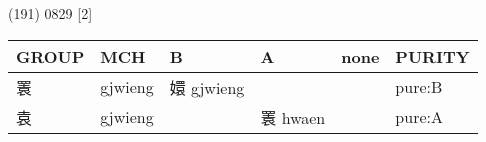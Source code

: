 \documentclass[14pt,a4paper]{scrartcl}
\begin{document}
(191) 0829 {[}2{]}

\begin{longtable}[c]{@{}llllll@{}}
\toprule
\begin{minipage}[b]{0.14\columnwidth}\raggedright\strut
GROUP
\strut\end{minipage} &
\begin{minipage}[b]{0.14\columnwidth}\raggedright\strut
MCH
\strut\end{minipage} &
\begin{minipage}[b]{0.14\columnwidth}\raggedright\strut
B
\strut\end{minipage} &
\begin{minipage}[b]{0.14\columnwidth}\raggedright\strut
A
\strut\end{minipage} &
\begin{minipage}[b]{0.14\columnwidth}\raggedright\strut
none
\strut\end{minipage} &
\begin{minipage}[b]{0.14\columnwidth}\raggedright\strut
PURITY
\strut\end{minipage}\tabularnewline
\midrule
\endhead
\begin{minipage}[t]{0.14\columnwidth}\raggedright\strut
瞏
\strut\end{minipage} &
\begin{minipage}[t]{0.14\columnwidth}\raggedright\strut
gjwieng
\strut\end{minipage} &
\begin{minipage}[t]{0.14\columnwidth}\raggedright\strut
嬛 gjwieng
\strut\end{minipage} &
\begin{minipage}[t]{0.14\columnwidth}\raggedright\strut
\strut\end{minipage} &
\begin{minipage}[t]{0.14\columnwidth}\raggedright\strut
\strut\end{minipage} &
\begin{minipage}[t]{0.14\columnwidth}\raggedright\strut
pure:B
\strut\end{minipage}\tabularnewline
\begin{minipage}[t]{0.14\columnwidth}\raggedright\strut
袁
\strut\end{minipage} &
\begin{minipage}[t]{0.14\columnwidth}\raggedright\strut
gjwieng
\strut\end{minipage} &
\begin{minipage}[t]{0.14\columnwidth}\raggedright\strut
\strut\end{minipage} &
\begin{minipage}[t]{0.14\columnwidth}\raggedright\strut
瞏 hwaen
\strut\end{minipage} &
\begin{minipage}[t]{0.14\columnwidth}\raggedright\strut
\strut\end{minipage} &
\begin{minipage}[t]{0.14\columnwidth}\raggedright\strut
pure:A
\strut\end{minipage}\tabularnewline
\bottomrule
\end{longtable}
\end{document}
